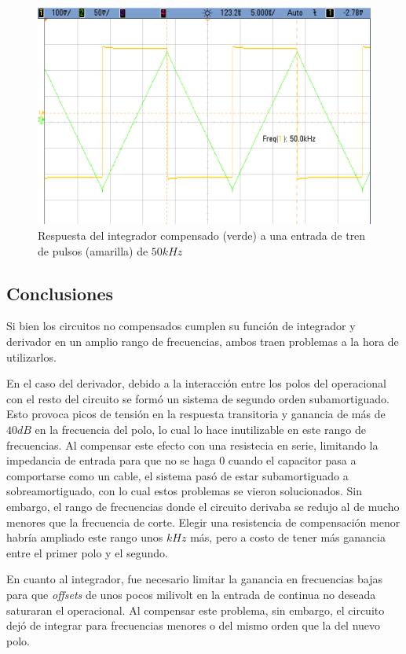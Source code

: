 \documentclass[../../main.tex]{subfiles}
\begin{document}
\begin{figure}  [H]
	\centering
	\label{fig:i-1k}
	\includegraphics[scale=0.4]{fotos/tc_tp2_ej4_icomp_50k.png}
	\caption{Respuesta del integrador compensado (verde) a una entrada de tren de pulsos (amarilla) de $50kHz$}
\end{figure}




\subsection{Conclusiones}
Si bien los circuitos no compensados cumplen su funci\'on de integrador y derivador en un amplio rango de frecuencias, ambos traen problemas a la hora de utilizarlos.\par

En el caso del derivador, debido a la interacci\'on entre los polos del operacional con el resto del circuito se form\'o un sistema de segundo orden subamortiguado. Esto provoca picos de tensi\'on en la respuesta transitoria y ganancia de m\'as de $40dB$ en la frecuencia del polo, lo cual lo hace inutilizable en este rango de frecuencias. Al compensar este efecto con una resistecia en serie, limitando la impedancia de entrada para que no se haga 0 cuando el capacitor pasa a comportarse como un cable, el sistema pas\'o de estar subamortiguado a sobreamortiguado, con lo cual estos problemas se vieron solucionados. Sin embargo, el rango de frecuencias donde el circuito derivaba se redujo al de mucho menores que la frecuencia de corte. Elegir una resistencia de compensaci\'on menor habr\'ia ampliado este rango unos $kHz$ m\'as, pero a costo de tener m\'as ganancia entre el primer polo y el segundo.\par

En cuanto al integrador, fue necesario limitar la ganancia en frecuencias bajas para que \textit{offsets} de unos pocos milivolt en la entrada de continua no deseada saturaran el operacional. Al compensar este problema, sin embargo, el circuito dej\'o de integrar para frecuencias menores o del mismo orden que la del nuevo polo.\par
\end{document}
